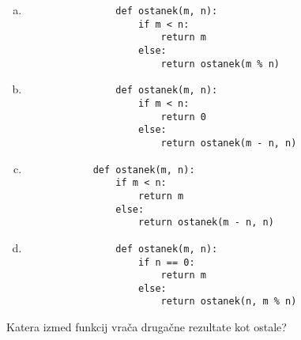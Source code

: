 \documentclass[arhiv, 10pt]{../izpit}
\begin{document}
        \begin{multicols}{2}
        \begin{enumerate}[(a)]
\item 
                \begin{verbatim}
                def ostanek(m, n):
                    if m < n:
                        return m
                    else:
                        return ostanek(m % n)
                \end{verbatim}
            
\item 
                \begin{verbatim}
                def ostanek(m, n):
                    if m < n:
                        return 0
                    else:
                        return ostanek(m - n, n)
                \end{verbatim}
            
\item 
            \begin{verbatim}
            def ostanek(m, n):
                if m < n:
                    return m
                else:
                    return ostanek(m - n, n)
            \end{verbatim}
        
\item 
                \begin{verbatim}
                def ostanek(m, n):
                    if n == 0:
                        return m
                    else:
                        return ostanek(n, m % n)
                \end{verbatim}
            
\end{enumerate}

        \end{multicols}
    
        \naloga*
        
        Katera izmed funkcij vrača drugačne rezultate kot ostale?
    
\end{document}
